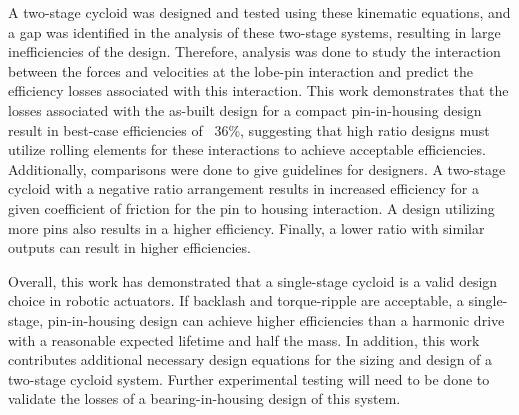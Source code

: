 A two-stage cycloid was designed and tested using these kinematic equations, and a gap was identified in the analysis of these two-stage systems, resulting in large inefficiencies of the design. Therefore, analysis was done to study the interaction between the forces and velocities at the lobe-pin interaction and predict the efficiency losses associated with this interaction. This work demonstrates that the losses associated with the as-built design for a compact pin-in-housing design result in best-case efficiencies of ~36\%, suggesting that high ratio designs must utilize rolling elements for these interactions to achieve acceptable efficiencies. Additionally, comparisons were done to give guidelines for designers. A two-stage cycloid with a negative ratio arrangement results in increased efficiency for a given coefficient of friction for the pin to housing interaction. A design utilizing more pins also results in a higher efficiency. Finally, a lower ratio with similar outputs can result in higher efficiencies. 

Overall, this work has demonstrated that a single-stage cycloid is a valid design choice in robotic actuators. If backlash and torque-ripple are acceptable, a single-stage, pin-in-housing design can achieve higher efficiencies than a harmonic drive with a reasonable expected lifetime and half the mass. In addition, this work contributes additional necessary design equations for the sizing and design of a two-stage cycloid system. Further experimental testing will need to be done to validate the losses of a bearing-in-housing design of this system. 
